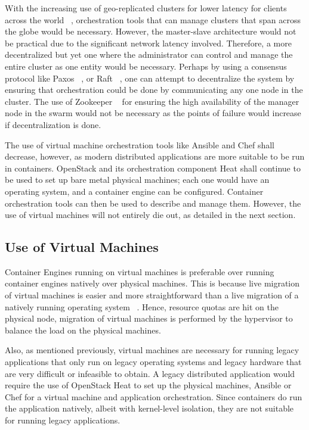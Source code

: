 \documentclass[10pt,twocolumn]{article}
\begin{document}
With the increasing use of geo-replicated clusters for lower latency for clients across the world ~\cite{georeplicated}, orchestration tools that can manage clusters that span across the globe would be necessary.
However, the master-slave architecture would not be practical due to the significant network latency involved.
Therefore, a more decentralized but yet one where the administrator can control and manage the entire cluster as one entity would be necessary.
Perhaps by using a consensus protocol like Paxos ~\cite{paxos}, or Raft ~\cite{raft}, one can attempt to decentralize the system by ensuring that orchestration could be done by communicating any one node in the cluster.
The use of Zookeeper ~\cite{zookeeper} for ensuring the high availability of the manager node in the swarm would not be necessary as the points of failure would increase if decentralization is done.

The use of virtual machine orchestration tools like Ansible and Chef shall decrease, however, as modern distributed applications are more suitable to be run in containers.
OpenStack and its orchestration component Heat shall continue to be used to set up bare metal physical machines; each one would have an operating system, and a container engine can be configured.
Container orchestration tools can then be used to describe and manage them.
However, the use of virtual machines will not entirely die out, as detailed in the next section.

\subsection{Use of Virtual Machines}

Container Engines running on virtual machines is preferable over running container engines natively over physical machines.
This is because live migration of virtual machines is easier and more straightforward than a live migration of a natively running operating system ~\cite{live_migration}.
Hence, resource quotas are hit on the physical node, migration of virtual machines is performed by the hypervisor to balance the load on the physical machines.

Also, as mentioned previously, virtual machines are necessary for running legacy applications that only run on legacy operating systems and legacy hardware that are very difficult or infeasible to obtain.
A legacy distributed application would require the use of OpenStack Heat to set up the physical machines, Ansible or Chef for a virtual machine and application orchestration.
Since containers do run the application natively, albeit with kernel-level isolation, they are not suitable for running legacy applications.
\end{document}
